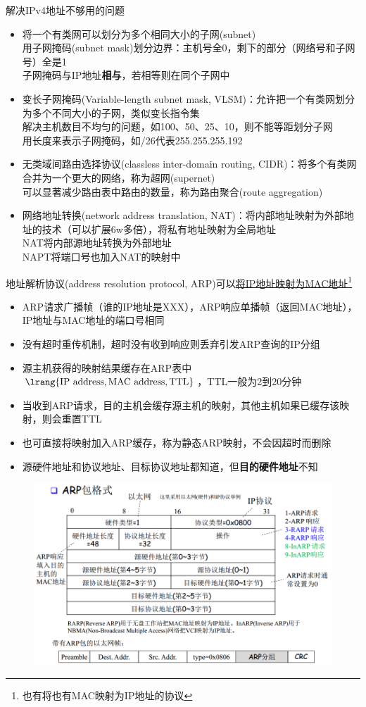 解决IPv4地址不够用的问题
\begin{itemize}
	\item 将一个有类网可以划分为多个相同大小的子网(subnet)\\
用子网掩码(subnet mask)划分边界：主机号全0，剩下的部分（网络号和子网号）全是1\\
子网掩码与IP地址\textbf{相与}，若相等则在同个子网中
	\item 变长子网掩码(Variable-length subnet mask, VLSM)：允许把一个有类网划分为多个不同大小的子网，类似变长指令集\\
解决主机数目不均匀的问题，如100、50、25、10，则不能等距划分子网\\
用长度来表示子网掩码，如/26代表255.255.255.192
	\item 无类域间路由选择协议(classless inter-domain routing, CIDR)：将多个有类网合并为一个更大的网络，称为超网(supernet)\\
可以显著减少路由表中路由的数量，称为路由聚合(route aggregation)
	\item 网络地址转换(network address translation, NAT)：将内部地址映射为外部地址的技术（可以扩展6w多倍），将私有地址映射为全局地址\\
NAT将内部源地址转换为外部地址\\
NAPT将端口号也加入NAT的映射中
\end{itemize}

地址解析协议(address resolution protocol, ARP)可以\underline{将IP地址映射为MAC地址}\footnote{也有将也有MAC映射为IP地址的协议}
\begin{itemize}
	\item ARP请求广播帧（谁的IP地址是XXX），ARP响应单播帧（返回MAC地址），IP地址与MAC地址的端口号相同
	\item 没有超时重传机制，超时没有收到响应则丢弃引发ARP查询的IP分组
	\item 源主机获得的映射结果缓存在ARP表中$\lrang{\text{IP address},\text{MAC address},\text{TTL}}$，TTL一般为2到20分钟
	\item 当收到ARP请求，目的主机会缓存源主机的映射，其他主机如果已缓存该映射，则会重置TTL
	\item 也可直接将映射加入ARP缓存，称为静态ARP映射，不会因超时而删除
	\item 源硬件地址和协议地址、目标协议地址都知道，但\textbf{目的硬件地址}不知
\end{itemize}
\begin{figure}[H]
	\centering
	\includegraphics[width=0.7\linewidth]{fig/ARP.PNG}
\end{figure}

